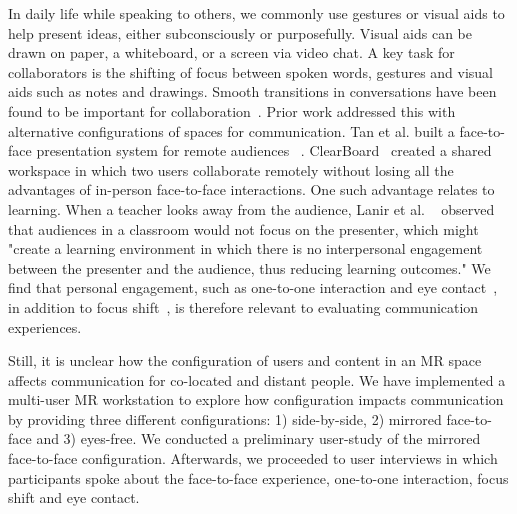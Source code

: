\documentclass[sigchi-a]{acmart}
\begin{document}
In daily life while speaking to others, we commonly use gestures or visual aids to help present ideas, either subconsciously or purposefully. Visual aids can be drawn on paper, a whiteboard, or a screen via video chat. A key task for collaborators is the shifting of focus between spoken words, gestures and visual aids such as notes and drawings. Smooth transitions in conversations have been found to be important for collaboration~\cite{buxton1992telepresence}.
Prior work addressed this with alternative configurations of spaces for communication. Tan et al. built a face-to-face presentation system for remote audiences ~\cite{gazeAwareness}. ClearBoard~\cite{ishii1993integration} created a shared workspace in which two users collaborate remotely without losing all the advantages of in-person face-to-face interactions. One such advantage relates to learning. When a teacher looks away from the audience, Lanir et al. ~\cite{Lanir2008ClassroomPresentationSoftware} observed that audiences in a classroom would not focus on the presenter, which might "create a learning environment in which there is no interpersonal engagement between the presenter and the audience, thus reducing learning outcomes." 
We find that personal engagement, such as one-to-one interaction and eye contact~\cite{InsaPositionInClassroom}, in addition to focus shift~\cite{buxton1992telepresence}, is therefore relevant to evaluating communication experiences.

Still, it is unclear how the configuration of users and content in an MR space affects communication for co-located and distant people.
We have implemented a multi-user MR workstation to explore how configuration impacts communication by providing three different configurations: 1) side-by-side, 2) mirrored face-to-face and 3) eyes-free. We conducted a preliminary user-study of the mirrored face-to-face configuration.
Afterwards, we proceeded to user interviews in which participants spoke about the face-to-face experience, one-to-one interaction, focus shift and eye contact. %
\end{document}
